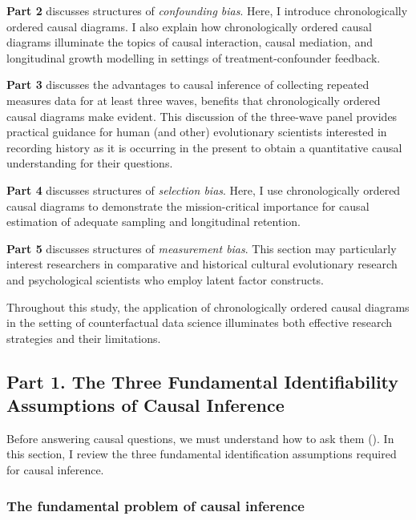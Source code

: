 \documentclass[
  singlecolumn]{article}
\begin{document}
\textbf{Part 2} discusses structures of \emph{confounding bias}. Here, I
introduce chronologically ordered causal diagrams. I also explain how
chronologically ordered causal diagrams illuminate the topics of causal
interaction, causal mediation, and longitudinal growth modelling in
settings of treatment-confounder feedback.

\textbf{Part 3} discusses the advantages to causal inference of
collecting repeated measures data for at least three waves, benefits
that chronologically ordered causal diagrams make evident. This
discussion of the three-wave panel provides practical guidance for human
(and other) evolutionary scientists interested in recording history as
it is occurring in the present to obtain a quantitative causal
understanding for their questions.

\textbf{Part 4} discusses structures of \emph{selection bias}. Here, I
use chronologically ordered causal diagrams to demonstrate the
mission-critical importance for causal estimation of adequate sampling
and longitudinal retention.

\textbf{Part 5} discusses structures of \emph{measurement bias}. This
section may particularly interest researchers in comparative and
historical cultural evolutionary research and psychological scientists
who employ latent factor constructs.

Throughout this study, the application of chronologically ordered causal
diagrams in the setting of counterfactual data science illuminates both
effective research strategies and their limitations.

\subsection{Part 1. The Three Fundamental Identifiability Assumptions of
Causal
Inference}\label{part-1.-the-three-fundamental-identifiability-assumptions-of-causal-inference}

Before answering causal questions, we must understand how to ask them
(). In this
section, I review the three fundamental identification assumptions
required for causal inference.

\subsubsection{The fundamental problem of causal
inference}\label{the-fundamental-problem-of-causal-inference}
\end{document}
